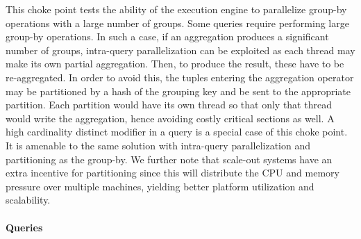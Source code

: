 
This choke point tests the ability of the execution engine to parallelize group-by operations with a large number of groups. Some queries require performing large group-by operations.
In such a case, if an aggregation produces a significant number of groups, intra-query parallelization can be exploited as each thread may make its own partial aggregation.
Then, to produce the result, these have to be re-aggregated. In order to avoid this, the tuples entering the aggregation operator may be partitioned by a hash of the grouping key and be sent to the appropriate partition.
Each partition would have its own thread so that only that thread would write the aggregation, hence avoiding costly critical sections as well. A high cardinality distinct modifier in a query is a special case of this choke point.
It is amenable to the same solution with intra-query parallelization and partitioning as the group-by.
We further note that scale-out systems have an extra incentive for partitioning since this will distribute the CPU and memory pressure over multiple machines, yielding better platform utilization and scalability.


\paragraph{Queries}
{\raggedright

}